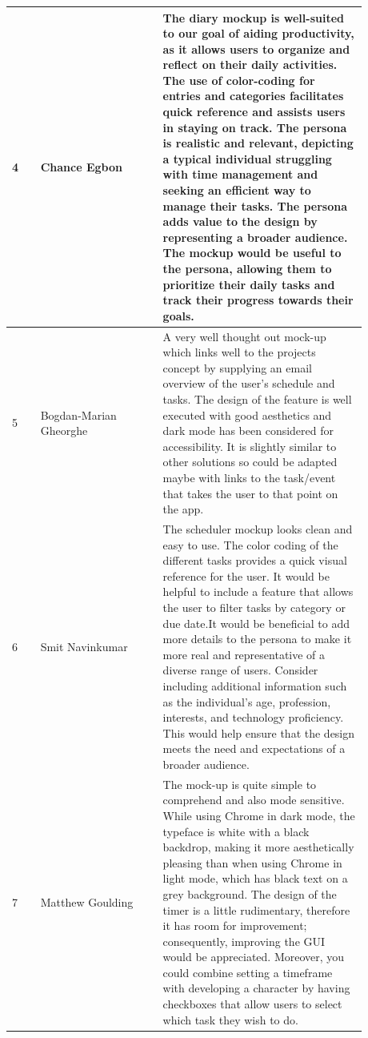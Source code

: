 \documentclass[a4paper]{article}
\begin{document}
{\small\noindent\begin{tabular}{|p{0.075\linewidth}|p{0.3\linewidth}|p{0.5\linewidth}|} 
\hline
 4 & Chance Egbon								& The diary mockup is well-suited to our goal of aiding productivity, as it allows users to organize and reflect on their daily activities. The use of color-coding for entries and categories facilitates quick reference and assists users in staying on track. The persona is realistic and relevant, depicting a typical individual struggling with time management and seeking an efficient way to manage their tasks. The persona adds value to the design by representing a broader audience. The mockup would be useful to the persona, allowing them to prioritize their daily tasks and track their progress towards their goals.\\
 \hline
 5 & Bogdan-Marian Gheorghe					& A very well thought out mock-up which links well to the projects concept by supplying an email overview of the user's schedule and tasks. The design of the feature is well executed with good aesthetics and dark mode has been considered for accessibility. It is slightly similar to other solutions so could be adapted maybe with links to the task/event that takes the user to that point on the app.\\
 \hline
 6 & Smit Navinkumar							& The scheduler mockup looks clean and easy to use. The color coding of the different tasks provides a quick visual reference for the user. It would be helpful to include a feature that allows the user to filter tasks by category or due date.It would be beneficial to add more details to the persona to make it more real and representative of a diverse range of users. Consider including additional information such as the individual's age, profession, interests, and technology proficiency. This would help ensure that the design meets the need and expectations of a broader audience.\\
 \hline
 7 & Matthew Goulding							& The mock-up is quite simple to comprehend and also mode sensitive. While using Chrome in dark mode, the typeface is white with a black backdrop, making it more aesthetically pleasing than when using Chrome in light mode, which has black text on a grey background. The design of the timer is a little rudimentary, therefore it has room for improvement; consequently, improving the GUI would be appreciated. Moreover, you could combine setting a timeframe with developing a character by having checkboxes that allow users to select which task they wish to do.\\
 \hline
\end{tabular}}
\end{document}
